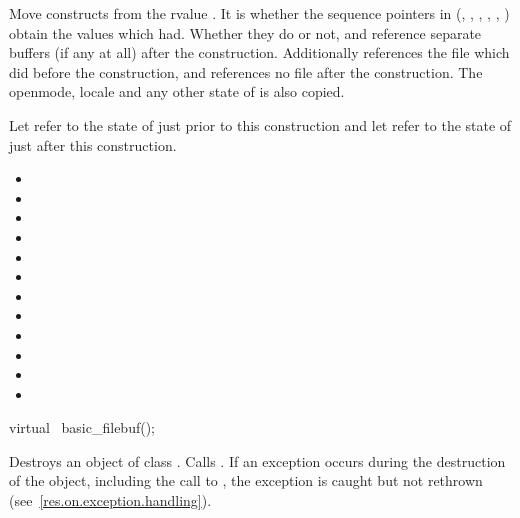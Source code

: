 \begin{itemdescr}
\pnum
\effects Move constructs from the rvalue . It
is  whether the sequence pointers in 
(, , ,
, , ) obtain
the values which  had. Whether they do or not, 
and  reference separate buffers (if any at all) after the
construction. Additionally  references the file
which  did before the construction, and
 references no file after the construction. The
openmode, locale and any other state of  is also
copied.

\pnum
\postconditions Let  refer to the state of
 just prior to this construction and let 
refer to the state of  just after this construction.

\begin{itemize}
\item {}
\item {}
\item {}
\item {}
\item {}
\item {}
\item {}
\item {}
\item {}
\item {}
\item {}
\item {}
\end{itemize}
\end{itemdescr}

%
\begin{itemdecl}
virtual ~basic_filebuf();
\end{itemdecl}

\begin{itemdescr}
\pnum
\effects
Destroys an object of class
.
Calls
.
If an exception occurs during the destruction of the object, including the call to , the exception is caught but not rethrown (see~\ref{res.on.exception.handling}).
\end{itemdescr}

